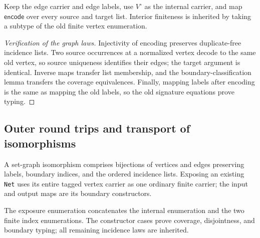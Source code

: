 

\begin{definition}
Keep the edge carrier and edge labels, use $V^{\circ}$ as the internal carrier,
and map $\mathsf{encode}$ over every source and target list. Interior finiteness
is inherited by taking a subtype of the old finite vertex enumeration.
\end{definition}
\begin{proof}[Verification of the graph laws]
Injectivity of encoding preserves duplicate-free incidence lists. Two source
occurrences at a normalized vertex decode to the same old vertex, so source
uniqueness identifies their edges; the target argument is identical. Inverse
maps transfer list membership, and the boundary-classification lemma transfers
the coverage equivalences. Finally, mapping labels after encoding is the same
as mapping the old labels, so the old signature equations prove typing.
\end{proof}

\subsection{Outer round trips and transport of isomorphisms}
\begin{definition}
A set-graph isomorphism comprises bijections of vertices and edges preserving
labels, boundary indices, and the ordered incidence lists. Exposing an existing
\texttt{Net} uses its entire tagged vertex carrier as one ordinary finite
carrier; the input and output maps are its boundary constructors.
\end{definition}
The exposure enumeration concatenates the internal enumeration and the two
finite index enumerations. The constructor cases prove coverage, disjointness,
and boundary typing; all remaining incidence laws are inherited.


